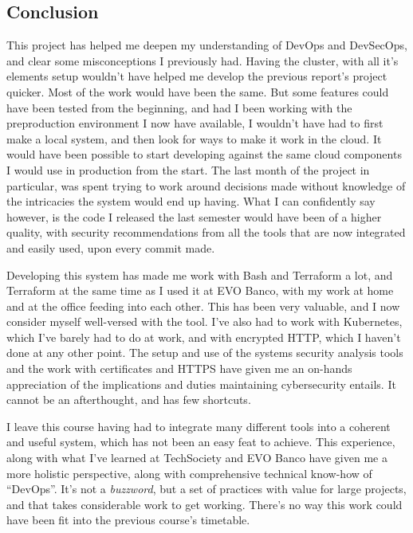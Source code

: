 \documentclass[11pt]{article}
\begin{document}
\begin{flushleft}
\clearpage
\section{Conclusion}
This project has helped me deepen my understanding of DevOps and DevSecOps, and clear some misconceptions I previously had. Having the cluster, with all it's elements setup wouldn't have helped me develop the previous report's project quicker. Most of the work would have been the same. But some features could have been tested from the beginning, and had I been working with the preproduction environment I now have available, I wouldn't have had to first make a local system, and then look for ways to make it work in the cloud. It would have been possible to start developing against the same cloud components I would use in production from the start. The last month of the project in particular, was spent trying to work around decisions made without knowledge of the intricacies the system would end up having. What I can confidently say however, is the code I released the last semester would have been of a higher quality, with security recommendations from all the tools that are now integrated and easily used, upon every commit made.
\linebreak

Developing this system has made me work with Bash and Terraform a lot, and Terraform at the same time as I used it at EVO Banco, with my work at home and at the office feeding into each other. This has been very valuable, and I now consider myself well-versed with the tool. I've also had to work with Kubernetes, which I've barely had to do at work, and with encrypted HTTP, which I haven't done at any other point. The setup and use of the systems security analysis tools and the work with certificates and HTTPS have given me an on-hands appreciation of the implications and duties maintaining cybersecurity entails. It cannot be an afterthought, and has few shortcuts.
\linebreak

I leave this course having had to integrate many different tools into a coherent and useful system, which has not been an easy feat to achieve. This experience, along with what I've learned at TechSociety and EVO Banco have given me a more holistic perspective, along with comprehensive technical know-how of ``DevOps''. It's not a \textit{buzzword}, but a set of practices with value for large projects, and that takes considerable work to get working. There's no way this work could have been fit into the previous course's timetable.
\linebreak



\end{flushleft}
\end{document}
